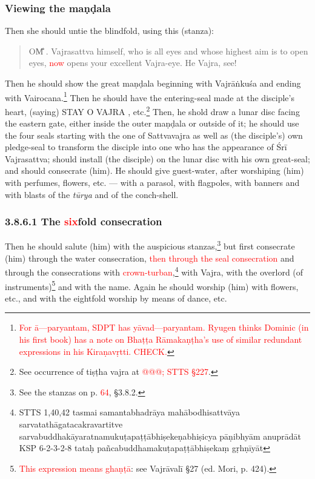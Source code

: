 \documentclass[11pt]{book}
\makeatletter
\def\fakesc#1{%
  \begingroup%
  \xdef\fake@name{\csname\curr@fontshape/\f@size\endcsname}%
  \fontsize{1.3\fontdimen8\fake@name}{\baselineskip}\selectfont%
  \uppercase{#1}%
  \endgroup%
}
\newcommand{\mantra}[1]{\fakesc{#1}}
\newcommand{\red}[1]{\textcolor{red}{#1}}
\makeatother
\begin{document}
\subsubsection{Viewing the maṇḍala}

Then she should untie the blindfold, using this (stanza):

\begin{verse}
\mantra{Om̐}. Vajrasattva himself, who is all eyes and whose highest aim is to open eyes, \red{now} opens your excellent Vajra-eye. He Vajra, see!
\end{verse}

Then he should show the great maṇḍala beginning with Vajrāṅkuśa and ending with Vairocana.\footnote{\red{For ā---paryantam, SDPT has yāvad---paryantam. Ryugen thinks Dominic (in his first book) has a note on Bhaṭṭa Rāmakaṇṭha's use of similar redundant expressions in his Kiraṇavṛtti. CHECK.}} Then he should have the entering-seal made at the disciple's heart, (saying) \mantra{stay o vajra}, etc.\footnote{See occurrence of tiṣṭha vajra at \red{@@@; STTS §227}.} Then, he shold draw a lunar disc facing the eastern gate, either inside the outer maṇḍala or outside of it; he should use the four seals starting with the one of Sattvavajra as well as (the disciple's) own pledge-seal to transform the disciple into one who has the appearance of Śrī Vajrasattva; should install (the disciple) on the lunar disc with his own great-seal; and should consecrate (him). He should give guest-water, after worshiping (him) with perfumes, flowers, etc. --- with a parasol, with flagpoles, with banners and with blasts of the \emph{tūrya} and of the conch-shell.

\subsubsection{3.8.6.1 The \red{six}fold consecration}

Then he should salute (him) with the auspicious stanzas,\footnote{See the stanzas on p. \red{64}, §3.8.2.} but first consecrate (him) through the water consecration, \red{then through the seal consecration}%
 and through the consecrations with \red{crown-turban},\footnote{
STTS 1,40,42 tasmai samantabhadrāya mahābodhisattvāya sarvatathāgatacakravartitve sarvabuddhakāyaratnamukuṭapaṭṭābhiṣekeṇabhiṣicya pāṇibhyām anuprādāt
KSP 6-2-3-2-8 tataḥ pañcabuddhamakuṭapaṭṭābhiṣekaṃ gṛhṇīyāt} with Vajra, with the overlord (of  instruments)\footnote{\red{This expression means ghaṇṭā}: see Vajrāvalī §27 (ed. Mori, p. 424).} and with the name. Again he should worship (him) with flowers, etc., and with the eightfold worship by means of dance, etc.
\end{document}
